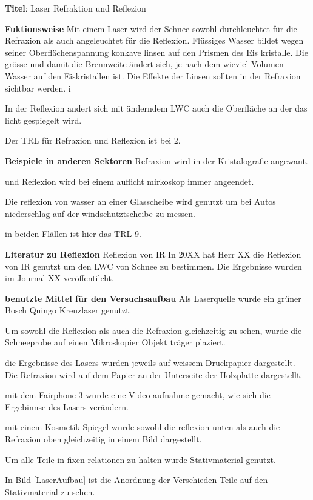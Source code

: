 


\textbf{Titel}: Laser Refraktion und Reflezion

\textbf{Fuktionsweise} Mit einem Laser wird der Schnee sowohl durchleuchtet für die Refraxion als auch angeleuchtet für die Reflexion. Flüssiges Wasser bildet wegen seiner Oberflächenspannung konkave linsen auf den Prismen des Eis kristalle. Die grösse und damit die Brennweite ändert sich, je nach dem wieviel Volumen Wasser auf den Eiskristallen ist. Die Effekte der Linsen sollten in der Refraxion sichtbar werden. i

In der Reflexion andert sich mit änderndem LWC auch die Oberfläche an der das licht gespiegelt wird.

Der TRL für Refraxion und Reflexion ist bei 2.

\textbf{Beispiele in anderen Sektoren}
Refraxion wird in der Kristalografie angewant.

und Reflexion wird bei einem auflicht mirkoskop immer angeendet.

Die reflexion von wasser an einer Glasscheibe wird genutzt um bei Autos niederschlag auf der windschutztscheibe zu messen.

in beiden Flällen ist hier das TRL 9.

\textbf{Literatur zu Reflexion}
Reflexion von IR
In 20XX hat Herr XX die Reflexion von IR genutzt um den LWC von Schnee zu bestimmen. Die Ergebnisse wurden im Journal XX veröffentilcht.

\textbf{benutzte Mittel für den Versuchsaufbau}
Als Laserquelle wurde ein grüner Bosch Quingo Kreuzlaser genutzt.

Um sowohl die Reflexion als auch die Refraxion gleichzeitig zu sehen, wurde die Schneeprobe auf einen Mikroskopier Objekt träger plaziert.

die Ergebnisse des Lasers wurden jeweils auf weissem Druckpapier dargestellt. Die Refraxion wird auf dem Papier an der Unterseite der Holzplatte dargestellt.

mit dem Fairphone 3 wurde eine Video aufnahme gemacht, wie sich die Ergebinnse des Lasers verändern.

mit einem Kosmetik Spiegel wurde sowohl die reflexion unten als auch die Refraxion oben gleichzeitig in einem Bild dargestellt.

Um alle Teile in fixen relationen zu halten wurde Stativmaterial genutzt.

In Bild \ref{LaserAufbau} ist die Anordnung der Verschieden Teile auf den Stativmaterial zu sehen.

